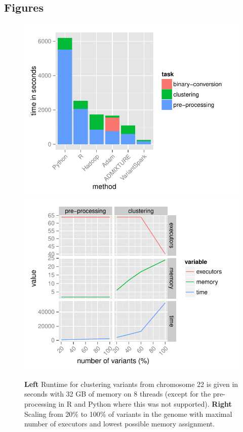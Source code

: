 \documentclass{bmcart}
\begin{document}
\begin{backmatter}
\section*{Figures}
  \begin{figure}[h!]
  \includegraphics[type=pdf,ext=.pdf,read=.pdf, scale=0.45]{images/Resources}
  \includegraphics[type=pdf,ext=.pdf,read=.pdf, scale=0.45]{images/Scaling}
  \caption{
      {\bf Left} Runtime for clustering variants from chromosome 22 is given in seconds with 32 GB of memory on 8 threads (except for the pre-processing in R and Python where this was not supported). 
      {\bf Right} Scaling from 20\% to 100\% of variants in the genome with maximal number of executors and lowest possible memory assignment.}
      \end{figure}


\end{backmatter}
\end{document}
